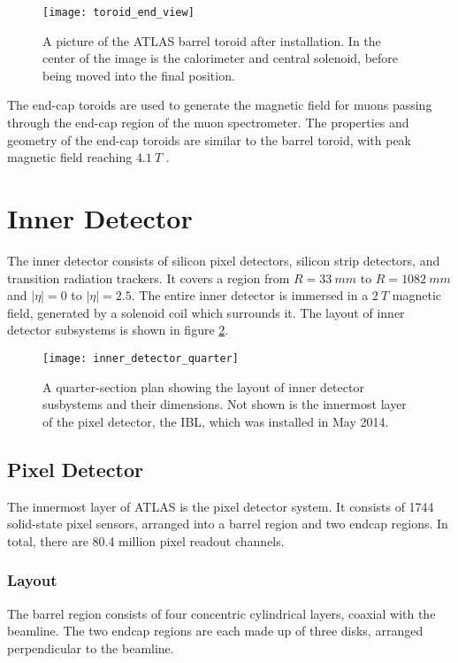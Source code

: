 \begin{figure}[h]
\texttt{[image: toroid\_end\_view]}
\caption{A picture of the ATLAS barrel toroid after installation. In
  the center of the image is the calorimeter and central solenoid,
  before being moved into the final position.}
\label{fig:toroid_end_view}
\end{figure}

The end-cap toroids are used to generate the magnetic field for muons
passing through the end-cap region of the muon spectrometer. The
properties and geometry of the end-cap toroids are similar to the
barrel toroid, with peak magnetic field reaching $4.1~T$ \cite{ref:atlas-detector-2008}.

\section{Inner Detector}

The inner detector consists of silicon pixel detectors, silicon strip
detectors, and transition radiation trackers. It covers a region from
$R = 33~mm$ to $R = 1082~mm$ and $|\eta| = 0$ to $|\eta| = 2.5$. The entire inner
detector is immersed in a $2~T$ magnetic field, generated by a
solenoid coil which surrounds it.\cite{atlas-detector-2008} The layout of inner detector
subsystems is shown in figure \ref{fig:inner_detector_quarter}.

\begin{figure}[h]
\texttt{[image: inner\_detector\_quarter]}
\caption{A quarter-section plan showing the layout of inner detector
  susbystems and their dimensions. Not shown is the innermost layer of
the pixel detector, the IBL, which was installed in May 2014.}
\label{fig:inner_detector_quarter}
\end{figure}

\subsection{Pixel Detector}

The innermost layer of ATLAS is the pixel detector system. It consists
of 1744 solid-state pixel sensors, arranged into a barrel region and two endcap
regions. In total, there are 80.4 million pixel readout channels. \cite{atlas-detector-2008}

\subsubsection{Layout}
The barrel region consists of four
concentric cylindrical layers, coaxial with the beamline. The two endcap regions are each made up
of three disks, arranged perpendicular to the beamline.

